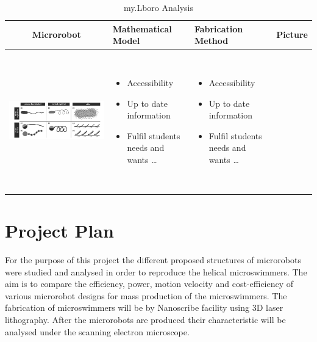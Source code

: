 \documentclass[a4paper,11pt]{article}
\begin{document}
\begin{sloppypar}
\begin{table}[h!]
  \centering
  \begin{tabular}{ | c | m{3cm} | m{3cm} | m{3cm} |}
    \hline
    Microrobot & Mathematical Model & Fabrication Method & Picture\\ \hline
    \begin{minipage}{.3\textwidth}
      \includegraphics[width=\linewidth, height=60mm]{cilia}
    \end{minipage}
    &
      \begin{itemize}
        \item Accessibility
        \item Up to date information
        \item Fulfil students needs and wants \ldots
      \end{itemize}
    & 
      \begin{itemize}
        \item Accessibility
        \item Up to date information
        \item Fulfil students needs and wants \ldots
      \end{itemize}
    \\ \hline
  \end{tabular}
  \caption{my.Lboro Analysis}\label{tbl:myLboro}
\end{table}

\section{Project Plan}
For the purpose of this project the different proposed structures of microrobots were studied
 and analysed in order to reproduce the helical microswimmers. The aim is to compare
 the efficiency, power, motion velocity and cost-efficiency of various microrobot designs for mass production
 of the microswimmers. The fabrication of microswimmers will be by Nanoscribe facility using 3D laser
 lithography. After the microrobots are produced their characteristic will be analysed
 under the scanning electron microscope.





\end{sloppypar}
\end{document}
